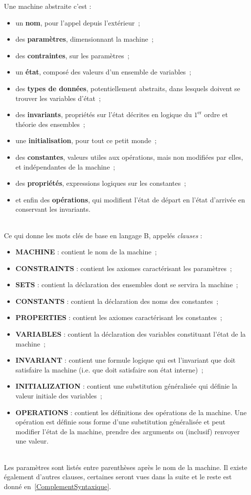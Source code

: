 \documentclass[10pt,a4paper]{article}
\begin{document}
Une machine abstraite c'est :
\begin{itemize}
\item un \textbf{nom}, pour l'appel depuis l'extérieur~;
\item des \textbf{paramètres}, dimensionnant la machine~;
\item des \textbf{contraintes}, sur les paramètres~;
\item un \textbf{état}, composé des valeurs d'un ensemble de variables~;
\item des \textbf{types de données}, potentiellement abstraits, dans lesquels doivent se trouver les variables d'état~;
\item des \textbf{invariants}, propriétés sur l'état décrites en logique du $1^{\text{er}}$ ordre et théorie des ensembles~;
\item une \textbf{initialisation}, pour tout ce petit monde~;
\item des \textbf{constantes}, valeurs utiles aux opérations, mais non modifiées par elles, et indépendantes de la machine~;
\item des \textbf{propriétés}, expressions logiques sur les constantes~;
\item et enfin des \textbf{opérations}, qui modifient l'état de départ en l'état d'arrivée en conservant les invariants.
\end{itemize}
\ \\
Ce qui donne les mots clés de base en langage B, appelés \emph{clauses} :
\begin{itemize}
\item \textbf{MACHINE} : contient le nom de la machine~;
\item \textbf{CONSTRAINTS} : contient les axiomes caractérisant les paramètres~;
\item \textbf{SETS} : contient la déclaration des ensembles dont se servira la machine~;
\item \textbf{CONSTANTS} : contient la déclaration des noms des constantes~;
\item \textbf{PROPERTIES} : contient les axiomes caractérisant les constantes~;
\item \textbf{VARIABLES} : contient la déclaration des variables constituant l'état de la machine~;
\item \textbf{INVARIANT} : contient une formule logique qui est l'invariant que doit satisfaire la machine (i.e. que doit satisfaire son état interne)~;
\item \textbf{INITIALIZATION} : contient une substitution généralisée qui définie la valeur initiale des variables~;
\item \textbf{OPERATIONS} : contient les définitions des opérations de la machine. Une opération est définie sous forme d'une substitution généralisée et peut modifier l'état de la machine, prendre des arguments ou (inclusif) renvoyer une valeur.
\end{itemize}
\ \\
Les paramètres sont listés entre parenthèses après le nom de la machine. Il existe également d'autres clauses, certaines seront vues dans la suite et le reste est donné en~\cref{ComplementSyntaxique}.
\end{document}
